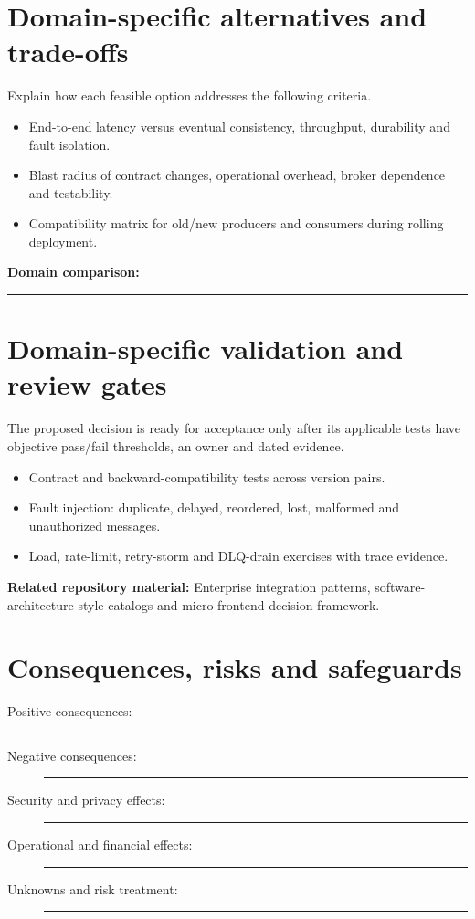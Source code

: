 \documentclass[11pt,letterpaper]{article}
\newcommand{\BlankResponse}{\rule[-0.4em]{0pt}{2em}\rule{0.65\linewidth}{0.4pt}}
\begin{document}
\section{Domain-specific alternatives and trade-offs}
Explain how each feasible option addresses the following criteria.
\begin{itemize}
\item End-to-end latency versus eventual consistency, throughput, durability and fault isolation.
\item Blast radius of contract changes, operational overhead, broker dependence and testability.
\item Compatibility matrix for old/new producers and consumers during rolling deployment.
\end{itemize}
\noindent\textbf{Domain comparison:} \BlankResponse
\section{Domain-specific validation and review gates}
The proposed decision is ready for acceptance only after its applicable
tests have objective pass/fail thresholds, an owner and dated evidence.
\begin{itemize}
\item Contract and backward-compatibility tests across version pairs.
\item Fault injection: duplicate, delayed, reordered, lost, malformed and unauthorized messages.
\item Load, rate-limit, retry-storm and DLQ-drain exercises with trace evidence.
\end{itemize}
\noindent\textbf{Related repository material:} Enterprise integration patterns, software-architecture style catalogs and micro-frontend decision framework.

\section{Consequences, risks and safeguards}
\begin{description}
\item[Positive consequences:] \BlankResponse
\item[Negative consequences:] \BlankResponse
\item[Security and privacy effects:] \BlankResponse
\item[Operational and financial effects:] \BlankResponse
\item[Unknowns and risk treatment:] \BlankResponse
\end{description}
\end{document}
